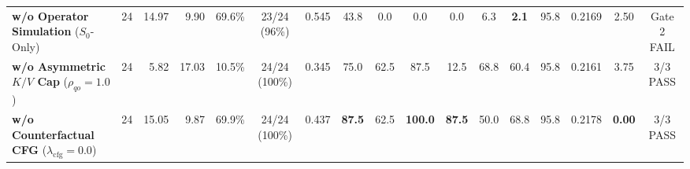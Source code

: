 \begin{table}[t]
{\begin{tabular}{l c rrr cc ccccc cccc c}
\textbf{w/o Operator Simulation} {\scriptsize($S_0$-Only)} & 24 & 14.97 & 9.90 & 69.6\% & 23/24 (96\%) & 0.545 & 43.8 & \textcolor{red!75!black}{0.0} & \textcolor{red!75!black}{0.0} & \textcolor{red!75!black}{0.0} & \textcolor{red!75!black}{6.3} & \textcolor{red!75!black}{\textbf{2.1}} & 95.8 & 0.2169 & 2.50 & \textcolor{red!75!black}{Gate 2 FAIL} \\
\textbf{w/o Asymmetric $K/V$ Cap} {\scriptsize($\rho_{qo}{=}1.0$)} & 24 & \textcolor{red!75!black}{5.82} & \textcolor{red!75!black}{17.03} & \textcolor{red!75!black}{10.5\%} & 24/24 (100\%) & 0.345 & 75.0 & 62.5 & 87.5 & \textcolor{red!75!black}{12.5} & 68.8 & 60.4 & 95.8 & 0.2161 & \textcolor{red!75!black}{3.75} & 3/3 PASS \\
\textbf{w/o Counterfactual CFG} {\scriptsize($\lambda_{\text{cfg}}{=}0.0$)} & 24 & 15.05 & 9.87 & 69.9\% & 24/24 (100\%) & 0.437 & \textbf{87.5} & 62.5 & \textbf{100.0} & \textbf{87.5} & \textcolor{red!75!black}{50.0} & 68.8 & 95.8 & 0.2178 & \textbf{0.00} & 3/3 PASS \\
\bottomrule
\end{tabular}%
}
\end{table}

